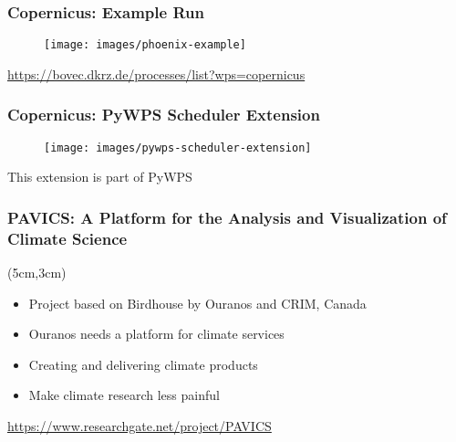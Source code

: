 \documentclass{beamer}
\begin{document}
\begin{frame}
\frametitle<presentation>{Copernicus: Example Run}

  \begin{figure}[ht]
    \centering
    \texttt{[image: images/phoenix-example]}
  \end{figure}

  \centering
  \footnotesize{\url{https://bovec.dkrz.de/processes/list?wps=copernicus}}

\end{frame}

\begin{frame}
\frametitle<presentation>{Copernicus: PyWPS Scheduler Extension}

  \begin{figure}[ht]
    \centering
    \texttt{[image: images/pywps-scheduler-extension]}
  \end{figure}

  \centering
  \footnotesize{This extension is part of PyWPS}

\end{frame}

\begin{frame}
  \frametitle{PAVICS: A Platform for the Analysis and Visualization of Climate Science}


  \begin{textblock*}{7cm}(5cm,3cm)
  \begin{itemize}
    \item Project based on Birdhouse by Ouranos and CRIM, Canada
    \item Ouranos needs a platform for climate services
    \item Creating and delivering climate products
    \item Make climate research less painful
  \end{itemize}
  \end{textblock*}

  \vspace{3cm}
  \centering
  \footnotesize{\url{https://www.researchgate.net/project/PAVICS}}
\end{frame}
\end{document}
